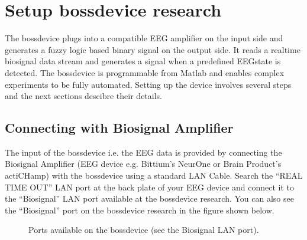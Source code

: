 \documentclass[letterpaper,10pt,english]{sphinxmanual}
\begin{document}
\chapter{Setup bossdevice research}
\label{\detokenize{2_setup_bossdevice_research:setup-bossdevice-research}}\label{\detokenize{2_setup_bossdevice_research::doc}}
\sphinxAtStartPar
The bossdevice plugs into a compatible EEG amplifier on the input side and generates a fuzzy logic based binary signal on the output side. It reads a real\sphinxhyphen{}time biosignal data stream and generates a  signal when a pre\sphinxhyphen{}defined EEG\sphinxhyphen{}state is detected. The bossdevice is programmable from Matlab and enables complex experiments to be fully automated. Setting up the device involves several steps and the next sections descibre their details.


\section{Connecting with Biosignal Amplifier}
\label{\detokenize{2_setup_bossdevice_research:connecting-with-biosignal-amplifier}}
\sphinxAtStartPar
The input of the bossdevice i.e. the EEG data is provided by connecting the Biosignal Amplifier (EEG device e.g. Bittium’s NeurOne or Brain Product’s actiCHamp) with the bossdevice using a standard LAN Cable. Search the “REAL TIME OUT” LAN port at the back plate of your EEG device and connect it to the “Biosignal” LAN port available at the bossdevice research. You can also see the “Biosignal” port on the bossdevice research in the figure shown below.

\begin{figure}[htbp]
\centering
\capstart

\noindent{}
\caption{Ports available on the bossdevice (see the Biosignal LAN port).}\label{\detokenize{2_setup_bossdevice_research:id1}}\end{figure}
\end{document}

